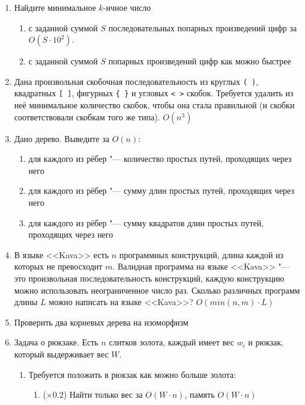 \begin{enumerate}
{\it Разорванным числом} называется последовательность из 
ровно $n$ цифр от 1 до 9 такая, что любые две соседние цифры 
отличаются не менее чем на 3. Упорядочим все разорванные числа 
по возрастанию. Найдите по заданному разорванному числу его номер
в этом списке. $O(9\cdot n)$
\item
Найдите минимальное $k$-ичное число  
    \begin{enumerate}   
    \item с заданной суммой $S$ последовательных попарных произведений цифр за $O(S \cdot 10^2)$.
    \item с заданной суммой $S$ попарных произведений цифр как можно быстрее
    \end{enumerate}
\item
Дана произвольная скобочная последовательность из круглых \texttt{( )},
 квадратных \texttt{[ ]}, фигурных \texttt{\{ \}} и угловых \texttt{< >} скобок. 
 Требуется удалить из неё минимальное количество скобок,
  чтобы она стала правильной (и скобки соответствовали скобкам
   того же типа). $O(n^3)$
\item
Дано дерево. Выведите за $O(n)$:
    \begin{enumerate}
    \item для каждого из рёбер "--- количество простых путей, 
    проходящих через него
    \item для каждого из рёбер "--- сумму длин простых путей, 
    проходящих через него
    \item для каждого из рёбер "--- сумму квадратов длин простых путей,
    проходящих через него
    \end{enumerate}
\item
В языке <<Kava>> есть $n$ программных конструкций, 
длина каждой из которых не превосходит $m$. 
Валидная программа на языке <<Kava>> "--- это произвольная 
последовательность конструкций, каждую конструкцию можно 
использовать неограниченное число раз. 
Сколько различных программ длины $L$ можно написать 
на языке <<Kava>>? $O(min(n, m)\cdot L)$
\item
Проверить два корневых дерева на изоморфизм
\item
Задача о рюкзаке. Есть $n$ слитков золота, 
каждый имеет вес $w_i$ и рюкзак, который выдерживает вес $W$.
\begin{enumerate}
    \item Требуется положить в рюкзак как можно больше золота:
    \begin{enumerate}
        \item ($\times 0.2$) Найти только вес за $O(W \cdot n)$, память $O(W \cdot n)$

\end{enumerate}
\end{enumerate}
\end{enumerate}

